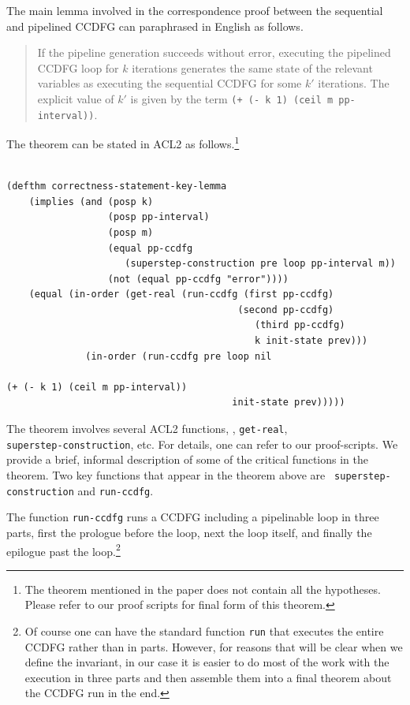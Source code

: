 
The main lemma involved in the correspondence proof between
the sequential and pipelined CCDFG can paraphrased in English as follows. 

\begin{quote}
 If the pipeline generation succeeds without error,
 executing the pipelined CCDFG loop for $k$ iterations
 generates the same state of the relevant variables as
 executing the sequential CCDFG for some $k'$ iterations.
 The explicit value of $k'$ is given by the term {\tt (+ (-
   k 1) (ceil m pp-interval))}.
 \end{quote}

The theorem can be stated in ACL2 as follows.\footnote{The theorem mentioned in the paper does not contain
all the hypotheses. Please refer to our proof scripts
for final form of this theorem.}

\small
\begin{verbatim}
    
(defthm correctness-statement-key-lemma
    (implies (and (posp k)
                  (posp pp-interval)
                  (posp m)
                  (equal pp-ccdfg 
                     (superstep-construction pre loop pp-interval m))
                  (not (equal pp-ccdfg "error"))))
    (equal (in-order (get-real (run-ccdfg (first pp-ccdfg) 
                                         (second pp-ccdfg) 
                            	            (third pp-ccdfg) 
                            	            k init-state prev)))
              (in-order (run-ccdfg pre loop nil 
								               		                  (+ (- k 1) (ceil m pp-interval)) 
                                 		init-state prev)))))
\end{verbatim}
\normalsize

The theorem involves several ACL2 functions, \eg,
{\tt get-real}, \\ {\tt superstep-construction}, etc. 
For details, one can
  refer to our proof-scripts. 
We provide a brief, informal
description of some of the critical functions in the theorem.
Two key functions that appear in the theorem above are {\tt
  superstep-construction} and {\tt run-ccdfg}.  

The function {\tt run-ccdfg} runs a CCDFG including a
pipelinable loop in three parts, first the prologue before the
loop, next the loop itself, and finally the epilogue past the
loop.\footnote{Of course one can have the standard function
  {\tt run} that executes the entire CCDFG rather than in
  parts.  However, for reasons that will be clear when we
  define the invariant, in our case it is easier to do most
  of the work with the execution in three parts and then
  assemble them into a final theorem about the CCDFG run in
  the end.}  

